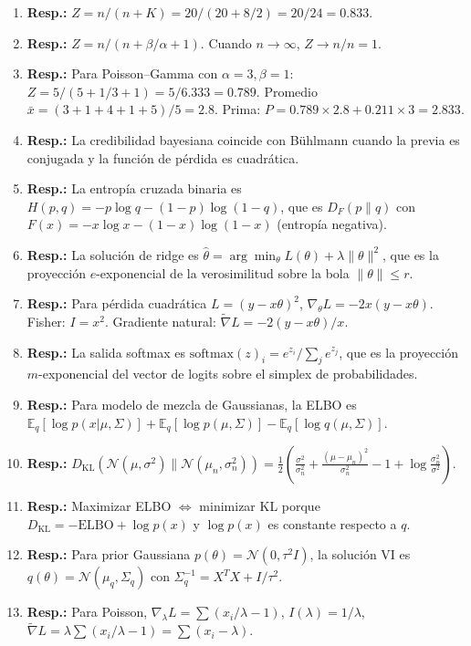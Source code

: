 \begin{enumerate}
	\item \textbf{Resp.:} $Z = n/(n+K) = 20/(20+8/2) = 20/24 = 0.833$.
	\item \textbf{Resp.:} $Z = n/(n + \beta/\alpha + 1)$.  Cuando $n \to \infty$, $Z \to n/n = 1$.
	\item \textbf{Resp.:} Para Poisson--Gamma con $\alpha=3, \beta=1$: $Z = 5/(5 + 1/3 + 1) = 5/6.333 = 0.789$.  Promedio $\bar{x} = (3+1+4+1+5)/5 = 2.8$.  Prima: $P = 0.789 \times 2.8 + 0.211 \times 3 = 2.833$.
	\item \textbf{Resp.:} La credibilidad bayesiana coincide con Bühlmann cuando la previa es conjugada y la función de pérdida es cuadrática.
	\item \textbf{Resp.:} La entropía cruzada binaria es $H(p, q) = -p\log q - (1-p)\log(1-q)$, que es $D_F(p \| q)$ con $F(x) = -x\log x - (1-x)\log(1-x)$ (entropía negativa).
	\item \textbf{Resp.:} La solución de ridge es $\hat\theta = \arg\min_\theta L(\theta) + \lambda\|\theta\|^2$, que es la proyección $e$-exponencial de la verosimilitud sobre la bola $\|\theta\| \le r$.
	\item \textbf{Resp.:} Para pérdida cuadrática $L = (y - x\theta)^2$, $\nabla_\theta L = -2x(y-x\theta)$.  Fisher: $I = x^2$.  Gradiente natural: $\tilde{\nabla} L = -2(y-x\theta)/x$.
	\item \textbf{Resp.:} La salida softmax es $\text{softmax}(z)_i = e^{z_i}/\sum_j e^{z_j}$, que es la proyección $m$-exponencial del vector de logits sobre el simplex de probabilidades.
	\item \textbf{Resp.:} Para modelo de mezcla de Gaussianas, la ELBO es $\mathbb{E}_q[\log p(x|\mu,\Sigma)] + \mathbb{E}_q[\log p(\mu,\Sigma)] - \mathbb{E}_q[\log q(\mu,\Sigma)]$.
	\item \textbf{Resp.:} $D_{\mathrm{KL}}(\mathcal{N}(\mu,\sigma^2) \| \mathcal{N}(\mu_n,\sigma_n^2)) = \frac{1}{2}\left(\frac{\sigma^2}{\sigma_n^2} + \frac{(\mu-\mu_n)^2}{\sigma_n^2} - 1 + \log\frac{\sigma_n^2}{\sigma^2}\right)$.
	\item \textbf{Resp.:} Maximizar ELBO $\iff$ minimizar KL porque $D_{\mathrm{KL}} = -\mathrm{ELBO} + \log p(x)$ y $\log p(x)$ es constante respecto a $q$.
	\item \textbf{Resp.:} Para prior Gaussiana $p(\theta) = \mathcal{N}(0, \tau^2 I)$, la solución VI es $q(\theta) = \mathcal{N}(\mu_q, \Sigma_q)$ con $\Sigma_q^{-1} = X^TX + I/\tau^2$.
	\item \textbf{Resp.:} Para Poisson, $\nabla_\lambda L = \sum(x_i/\lambda - 1)$, $I(\lambda) = 1/\lambda$, $\tilde{\nabla} L = \lambda \sum(x_i/\lambda - 1) = \sum(x_i - \lambda)$.

\end{enumerate}
